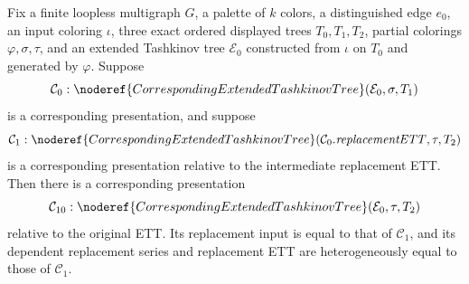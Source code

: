 \begin{lemma}
Fix a finite loopless multigraph \(G\), a palette of \(k\) colors, a
distinguished edge \(e_0\), an input coloring \(\iota\), three exact ordered
displayed trees \(T_0,T_1,T_2\), partial colorings
\(\varphi,\sigma,\tau\), and an extended Tashkinov tree \(\mathcal E_0\)
constructed from \(\iota\) on \(T_0\) and generated by \(\varphi\).  Suppose
\[
 \mathcal C_0:
 \noderef{CorrespondingExtendedTashkinovTree}
   (\mathcal E_0,\sigma,T_1)
\]
is a corresponding presentation, and suppose
\[
 \mathcal C_1:
 \noderef{CorrespondingExtendedTashkinovTree}
   (\mathcal C_0.\mathit{replacementETT},\tau,T_2)
\]
is a corresponding presentation relative to the intermediate replacement
ETT.  Then there is a corresponding presentation
\[
 \mathcal C_{10}:
 \noderef{CorrespondingExtendedTashkinovTree}
   (\mathcal E_0,\tau,T_2)
\]
relative to the original ETT.  Its replacement input is equal to that of
\(\mathcal C_1\), and its dependent replacement series and replacement ETT
are heterogeneously equal to those of \(\mathcal C_1\).
\end{lemma}
